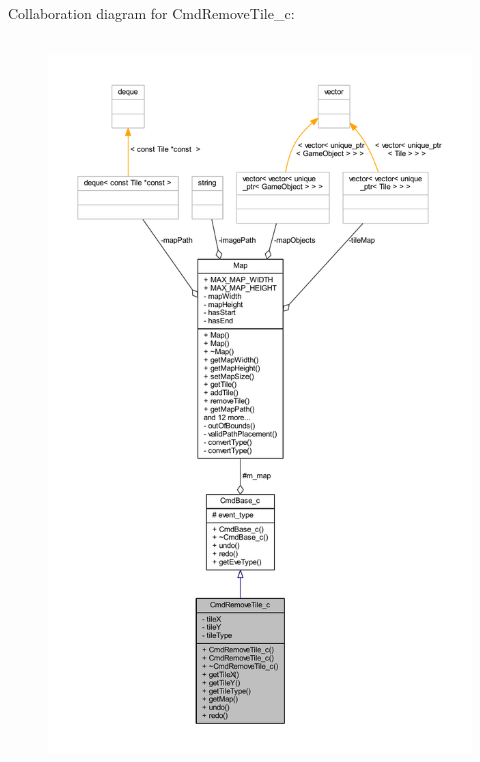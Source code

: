 Collaboration diagram for Cmd\+Remove\+Tile\+\_\+c\+:
\nopagebreak
\begin{figure}[H]
\begin{center}
\leavevmode
\includegraphics[height=550pt]{class_cmd_remove_tile__c__coll__graph}
\end{center}
\end{figure}

